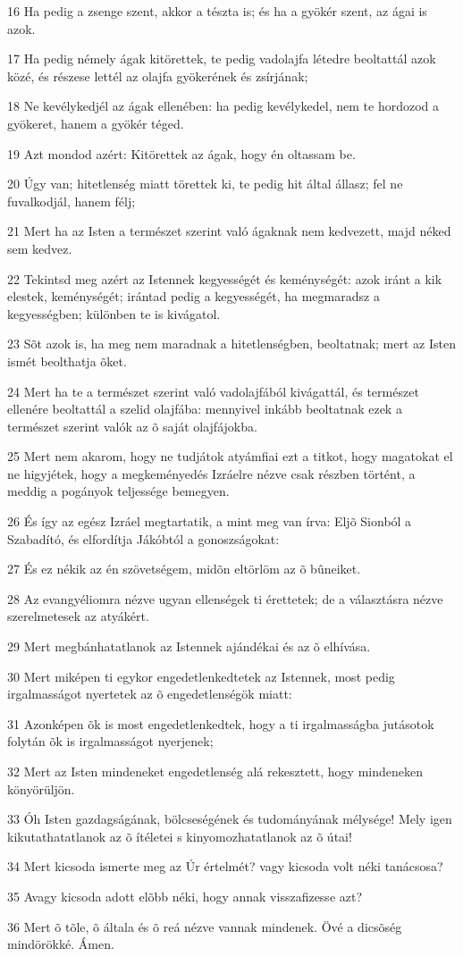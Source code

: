 \par 16 Ha pedig a zsenge szent, akkor a tészta is; és ha a gyökér szent, az ágai is azok.
\par 17 Ha pedig némely ágak kitörettek, te pedig vadolajfa létedre beoltattál azok közé, és részese lettél az olajfa gyökerének és zsírjának;
\par 18 Ne kevélykedjél az ágak ellenében: ha pedig kevélykedel, nem te hordozod a gyökeret, hanem a gyökér téged.
\par 19 Azt mondod azért: Kitörettek az ágak, hogy én oltassam be.
\par 20 Úgy van; hitetlenség miatt törettek ki, te pedig hit által állasz; fel ne fuvalkodjál, hanem félj;
\par 21 Mert ha az Isten a természet szerint való ágaknak nem kedvezett, majd néked sem kedvez.
\par 22 Tekintsd meg azért az Istennek kegyességét és keménységét: azok iránt a kik elestek, keménységét; irántad pedig a kegyességét, ha megmaradsz a kegyességben; különben te is kivágatol.
\par 23 Sõt azok is, ha meg nem maradnak a hitetlenségben, beoltatnak; mert az Isten ismét beolthatja õket.
\par 24 Mert ha te a természet szerint való vadolajfából kivágattál, és természet ellenére beoltattál a szelid olajfába: mennyivel inkább beoltatnak ezek a természet szerint valók az õ saját olajfájokba.
\par 25 Mert nem akarom, hogy ne tudjátok atyámfiai ezt a titkot, hogy magatokat el ne higyjétek, hogy a megkeményedés Izráelre nézve csak részben  történt, a meddig a pogányok teljessége bemegyen.
\par 26 És így az egész Izráel megtartatik, a mint meg van írva: Eljõ Sionból a Szabadító, és elfordítja Jákóbtól a gonoszságokat:
\par 27 És ez nékik az én szövetségem, midõn eltörlöm az õ bûneiket.
\par 28 Az evangyéliomra nézve ugyan ellenségek ti érettetek; de a választásra nézve szerelmetesek az atyákért.
\par 29 Mert megbánhatatlanok az Istennek ajándékai és az õ elhívása.
\par 30 Mert miképen ti egykor engedetlenkedtetek az Istennek, most pedig irgalmasságot nyertetek az õ engedetlenségök miatt:
\par 31 Azonképen õk is most engedetlenkedtek, hogy a ti irgalmasságba jutásotok folytán õk is irgalmasságot nyerjenek;
\par 32 Mert az Isten mindeneket engedetlenség alá rekesztett, hogy mindeneken könyörüljön.
\par 33 Óh Isten gazdagságának, bölcseségének és tudományának mélysége! Mely igen kikutathatatlanok az õ ítéletei s kinyomozhatatlanok az õ útai!
\par 34 Mert kicsoda ismerte meg az Úr értelmét? vagy kicsoda volt néki tanácsosa?
\par 35 Avagy kicsoda adott elõbb néki, hogy annak visszafizesse azt?
\par 36 Mert õ tõle, õ általa és õ reá nézve vannak mindenek. Övé a dicsõség mindörökké. Ámen.

